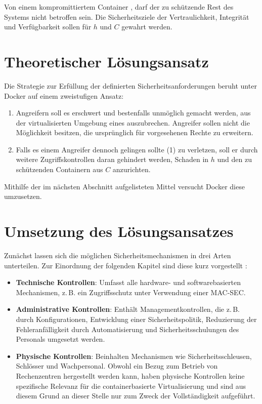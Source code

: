 \documentclass[../main.tex]{subfiles}
\begin{document}
    Von einem kompromittiertem Container \cbroken{}, darf der zu schützende Rest des Systems nicht betroffen sein. Die Sicherheitsziele der Vertraulichkeit, Integrität und Verfügbarkeit sollen für \(h\) und \(C\) gewahrt werden.

  \section{Theoretischer Lösungsansatz}
  \label{questionSolutionTheory}
    Die Strategie zur Erfüllung der definierten Sicherheitsanforderungen beruht unter Docker auf einem zweistufigen Ansatz:

    \begin{enumerate}[label=(\arabic*)]
      \item Angreifern soll es erschwert und bestenfalls unmöglich gemacht werden, aus der virtualisierten Umgebung eines \cbroken{} auszubrechen. Angreifer sollen nicht die Möglichkeit besitzen, die ursprünglich für \cbroken{} vorgesehenen Rechte zu erweitern.
      \item Falls es einem Angreifer dennoch gelingen sollte (1) zu verletzen, soll er durch weitere Zugriffskontrollen daran gehindert werden, Schaden in \(h\) und den zu schützenden Containern aus \(C\) anzurichten.
    \end{enumerate}

    Mithilfe der im nächsten Abschnitt aufgelisteten Mittel versucht Docker diese umzusetzen.


  \section{Umsetzung des Lösungsansatzes} %
  \label{questionRealization}
    Zunächst lassen sich die möglichen Sicherheitsmechanismen in drei Arten unterteilen. Zur Einordnung der folgenden Kapitel sind diese kurz vorgestellt \cite[S.40ff.]{CISSP}\cite[S.23]{nist}:

    \begin{itemize}
      \item \textbf{Technische Kontrollen}: Umfasst alle hardware- und softwarebasierten Mechanismen, z.\,B. ein Zugriffsschutz unter Verwendung einer \acrshort{MAC-SEC}.
      \item \textbf{Administrative Kontrollen}: Enthält Managementkontrollen, die z.\,B. durch Konfigurationen, Entwicklung einer Sicherheitspolitik, Reduzierung der Fehleranfälligkeit durch Automatisierung und Sicherheitsschulungen des Personals umgesetzt werden.
      \item \textbf{Physische Kontrollen}: Beinhalten Mechanismen wie Sicherheitsschleusen, Schlösser und Wachpersonal. Obwohl ein Bezug zum Betrieb von Rechenzentren hergestellt werden kann, haben physische Kontrollen keine spezifische Relevanz für die containerbasierte Virtualisierung und sind aus diesem Grund an dieser Stelle nur zum Zweck der Vollständigkeit aufgeführt.
    \end{itemize}
\end{document}
